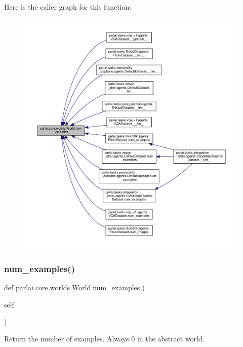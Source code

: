Here is the caller graph for this function\+:
\nopagebreak
\begin{figure}[H]
\begin{center}
\leavevmode
\includegraphics[width=350pt]{classparlai_1_1core_1_1worlds_1_1World_a7c7258c4ad6a6bdfc76287832876a25d_icgraph}
\end{center}
\end{figure}
\mbox{\label{classparlai_1_1core_1_1worlds_1_1World_a0402b615564d760fac542b8c5a504be5}} 
\subsubsection{\texorpdfstring{num\+\_\+examples()}{num\_examples()}}
{\footnotesize\ttfamily def parlai.\+core.\+worlds.\+World.\+num\+\_\+examples (\begin{DoxyParamCaption}\item[{}]{self }\end{DoxyParamCaption})}

\begin{DoxyVerb}Return the number of examples. Always 0 in the abstract world.\end{DoxyVerb}
 

